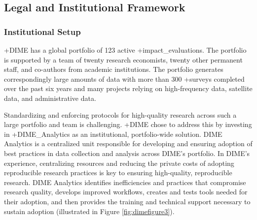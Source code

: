 \documentclass[
]{WileySix}
\begin{document}
\hypertarget{legal-and-institutional-framework-7}{%
\subsection{Legal and Institutional Framework}\label{legal-and-institutional-framework-7}}

\hypertarget{institutional-setup-7}{%
\subsubsection{Institutional Setup}\label{institutional-setup-7}}

+DIME\textbar{} has a global portfolio of 123 active +impact\_evaluations\textbar. The portfolio is supported by a team of twenty research economists, twenty other permanent staff, and co-authors from academic institutions. The portfolio generates correspondingly large amounts of data with more than 300 +surveys\textbar{} completed over the past six years and many projects relying on high-frequency data, satellite data, and administrative data.

Standardizing and enforcing protocols for high-quality research across such a large portfolio and team is challenging. +DIME\textbar{} chose to address this by investing in +DIME\_Analytics\textbar{} as an institutional, portfolio-wide solution. DIME Analytics is a centralized unit responsible for developing and ensuring adoption of best practices in data collection and analysis across DIME's portfolio. In DIME's experience, centralizing resources and reducing the private costs of adopting reproducible research practices is key to ensuring high-quality, reproducible research. DIME Analytics identifies inefficiencies and practices that compromise research quality, develops improved workflows, creates and tests tools needed for their adoption, and then provides the training and technical support necessary to sustain adoption (illustrated in Figure \ref{fig:dimefigure3}).
\end{document}
